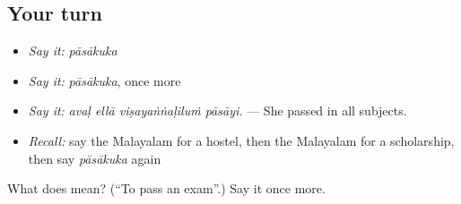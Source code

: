 \subsection*{Your turn}
\begin{itemize}
\raggedright
  \item \emph{Say it:} \emph{pāsākuka}
  \item \emph{Say it:} \emph{pāsākuka}, once more
  \item \emph{Say it:} \emph{avaḷ ellā viṣayaṅṅaḷiluṁ pāsāyi.} — She passed in all subjects.
  \item \emph{Recall:} say the Malayalam for a hostel, then the Malayalam for a scholarship, then say \emph{pāsākuka} again
\end{itemize}

\begin{tcolorbox}[breakable,colback=teal!4,colframe=teal!35!black,title={Before you move on}]
What does  mean? (\textquotedblleft{}To pass an exam\textquotedblright{}.) Say it once more.
\end{tcolorbox}
